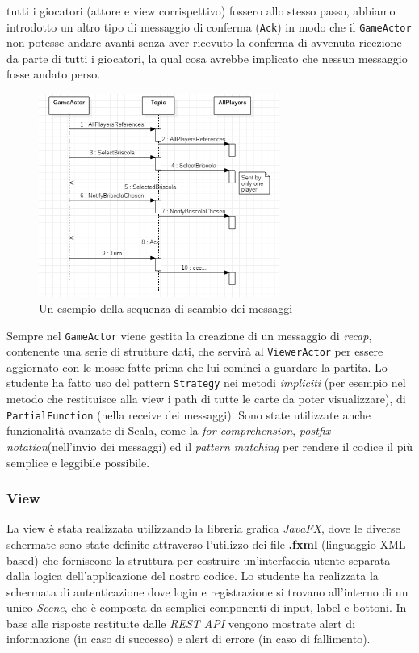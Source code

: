 tutti i giocatori (attore e view corrispettivo) fossero allo stesso passo, abbiamo introdotto un altro tipo di messaggio di conferma (\texttt{Ack}) in modo che il \texttt{GameActor} non potesse andare avanti senza aver ricevuto la conferma di avvenuta ricezione da parte di tutti i giocatori, la qual cosa avrebbe implicato che nessun messaggio fosse andato perso. 

\begin{figure}[h!]
 \centering
  \includegraphics[width=0.7\textwidth]{actorsMsgSeq.png}
   \caption{Un esempio della sequenza di scambio dei messaggi}
\end{figure}

Sempre nel \texttt{GameActor} viene gestita la creazione di un messaggio di \textit{recap}, contenente una serie di strutture dati, che servirà al \texttt{ViewerActor} per essere aggiornato con le mosse fatte prima che lui cominci a guardare la partita. Lo studente ha fatto uso del pattern \texttt{Strategy} nei metodi \textit{impliciti} (per esempio nel metodo che restituisce alla view i path di tutte le carte da poter visualizzare), di \texttt{PartialFunction} (nella receive dei messaggi). Sono state utilizzate anche funzionalità avanzate di Scala, come la \textit{for comprehension}, \textit{postfix notation}(nell'invio dei messaggi) ed il \textit{pattern matching} per rendere il codice il più semplice e leggibile possibile.

 \subsubsection{View}\label{subsub:jakova:view}
    La view è stata realizzata utilizzando la libreria grafica \textit{JavaFX}, dove le diverse schermate sono state definite attraverso l’utilizzo dei file \textbf{.fxml} (linguaggio XML-based) che forniscono la struttura per costruire un'interfaccia utente separata dalla logica dell'applicazione del nostro codice. Lo studente ha realizzata la schermata di autenticazione dove login e registrazione si trovano all’interno di un unico \textit{Scene}, che è composta da semplici componenti di input, label e bottoni. In base alle risposte restituite dalle \textit{REST API} vengono mostrate alert di informazione (in caso di successo) e alert di errore (in caso di fallimento). 

